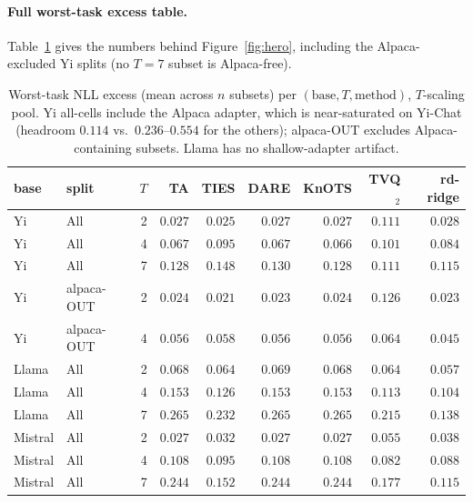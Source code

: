 \paragraph{Full worst-task excess table.} Table~\ref{tab:e6-worst}
gives the numbers behind Figure~\ref{fig:hero}, including the
Alpaca-excluded Yi splits (no $T = 7$ subset is Alpaca-free).

\begin{table}[h]
\centering
\caption{Worst-task NLL excess (mean across $n$ subsets) per
$(\text{base}, T, \text{method})$, $T$-scaling pool. Yi all-cells
include the Alpaca adapter, which is near-saturated on Yi-Chat
(headroom $0.114$ vs.\ $0.236$--$0.554$ for the others); alpaca-OUT
excludes Alpaca-containing subsets. Llama has no shallow-adapter
artifact.}
\label{tab:e6-worst}
\small
\begin{tabular}{llr|rrrrrr}
\hline
base & split & $T$ & TA & TIES & DARE & KnOTS & TVQ$_2$ & rd-ridge \\
\hline
Yi    & All        & 2 & $0.027$ & $0.025$ & $0.027$ & $0.027$ & $0.111$ & $0.028$ \\
Yi    & All        & 4 & $0.067$ & $0.095$ & $0.067$ & $0.066$ & $0.101$ & $0.084$ \\
Yi    & All        & 7 & $0.128$ & $0.148$ & $0.130$ & $0.128$ & $0.111$ & $\mathbf{0.115}$ \\
Yi    & alpaca-OUT & 2 & $0.024$ & $0.021$ & $0.023$ & $0.024$ & $0.126$ & $0.023$ \\
Yi    & alpaca-OUT & 4 & $0.056$ & $0.058$ & $0.056$ & $0.056$ & $0.064$ & $\mathbf{0.045}$ \\
\hline
Llama & All        & 2 & $0.068$ & $0.064$ & $0.069$ & $0.068$ & $0.064$ & $\mathbf{0.057}$ \\
Llama & All        & 4 & $0.153$ & $0.126$ & $0.153$ & $0.153$ & $0.113$ & $\mathbf{0.104}$ \\
Llama & All        & 7 & $0.265$ & $0.232$ & $0.265$ & $0.265$ & $0.215$ & $\mathbf{0.138}$ \\
\hline
Mistral & All      & 2 & $0.027$ & $0.032$ & $0.027$ & $0.027$ & $0.055$ & $0.038$ \\
Mistral & All      & 4 & $0.108$ & $0.095$ & $0.108$ & $0.108$ & $0.082$ & $0.088$ \\
Mistral & All      & 7 & $0.244$ & $0.152$ & $0.244$ & $0.244$ & $0.177$ & $\mathbf{0.115}$ \\
\hline
\end{tabular}
\end{table}

